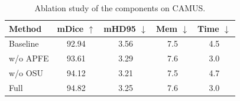\begin{table}[t]
    \centering
    \caption{Ablation study of the components on CAMUS.}
    \label{tab:abl}
    \begin{tabular}{lcccc}
        \toprule
        \textbf{Method}     & \textbf{mDice $\uparrow$} & \textbf{mHD95 $\downarrow$} & \textbf{Mem $\downarrow$} & \textbf{Time $\downarrow$} \\
        \midrule
        Baseline            & 92.94  & 3.56 & 7.5 & 4.5 \\
        w/o APFE            & 93.61  & 3.29 & 7.6 & 3.0 \\
        w/o OSU             & 94.12  & 3.21 & 7.5 & 4.7 \\
        \midrule
        Full                & 94.82  & 3.25 & 7.6 & 3.0 \\
        \bottomrule
    \end{tabular}
\end{table}
